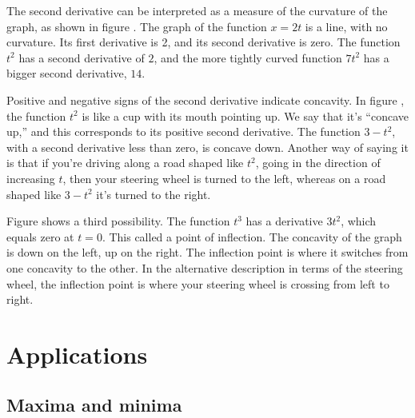 %
The second derivative can be interpreted as a measure of the curvature of the graph,
as shown in figure . The graph of the function $x=2t$ is a line,
with no curvature. Its first derivative is 2, and its second derivative is zero.
The function $t^2$ has a second derivative of $2$, and the more tightly curved
function $7t^2$ has a bigger second derivative, $14$.


Positive and negative signs of the second derivative indicate concavity.
In figure ,
the function $t^2$ is like a cup with its mouth pointing up. We say that it's ``concave up,'' and this
corresponds to its positive second derivative. The function $3-t^2$, with a second derivative less than
zero, is concave down. Another way of saying it is that if you're driving along a road shaped like $t^2$,
going in the direction of increasing $t$, then your steering wheel is turned to the left, whereas on
a road shaped like $3-t^2$ it's turned to the right.


Figure  shows a third possibility. The function $t^3$ has a derivative $3t^2$, which equals
zero at $t=0$. This called a point of inflection. The concavity of the graph is down on the left, up on the right.
The inflection point is where it switches from one concavity to the other. In the alternative description in
terms of the steering wheel, the inflection point is where your steering wheel is crossing from left to right.\label{inflection}

\section{Applications}
\subsection{Maxima and minima}


